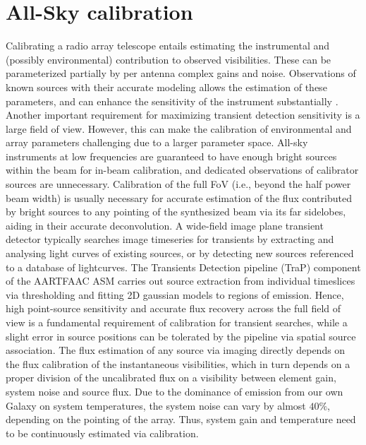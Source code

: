 \documentclass{aa}
\begin{document}
\section{\label{sec:Array-calibration-for}All-Sky calibration}
Calibrating  a radio  array telescope  entails estimating  the  instrumental and
(possibly environmental)  contribution to  observed visibilities.  These  can be
parameterized partially by per antenna  complex gains and noise. Observations of
known  sources with  their  accurate  modeling allows  the  estimation of  these
parameters,  and can  enhance the  sensitivity of  the  instrument substantially
\citep{taylor1999synthesis}.   Another  important  requirement  for  maximizing
transient detection  sensitivity is  a large field  of view.  However,  this can
make the calibration of environmental  and array parameters challenging due to a
larger parameter  space.  All-sky instruments at low  frequencies are guaranteed
to  have enough  bright sources  within the  beam for  in-beam  calibration, and
dedicated observations  of calibrator  sources are unnecessary.   Calibration of
the full FoV  (i.e., beyond the half power beam width)  is usually necessary for
accurate estimation of the flux contributed by bright sources to any pointing of
the  synthesized  beam   via  its  far  sidelobes,  aiding   in  their  accurate
deconvolution.  A  wide-field image plane transient  detector typically searches
image  timeseries for  transients by  extracting and  analysing light  curves of
existing  sources, or  by  detecting new  sources  referenced to  a database  of
lightcurves.  The Transients  Detection pipeline (TraP) \citep{swinbank2013trap}
component  of the  AARTFAAC ASM  carries out  source extraction  from individual
timeslices  via  thresholding and  fitting  2D  gaussian  models to  regions  of
emission.   Hence,  high point-source  sensitivity  and  accurate flux  recovery
across the  full field of view  is a fundamental requirement  of calibration for
transient searches, while a slight error in source positions can be tolerated by
the pipeline via spatial source  association.  The flux estimation of any source
via  imaging directly  depends  on  the flux  calibration  of the  instantaneous
visibilities, which  in turn  depends on a  proper division of  the uncalibrated
flux on a visibility between element gain, system noise and source flux.  Due to
the dominance of emission from our own Galaxy on system temperatures, the system
noise can vary by almost $40\%$,  depending on the pointing of the array.  Thus,
system gain and  temperature need to be continuously  estimated via calibration.
\end{document}
